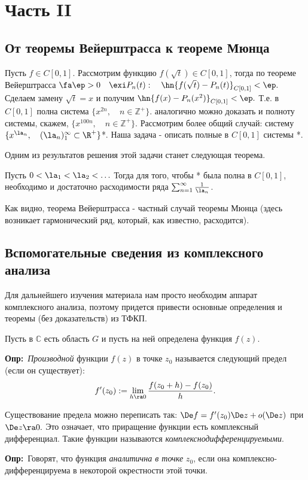 \documentclass[a4paper]{article}
\def\defin{\noindent\textbf{Опр:}\ }
\begin{document}
\newpage
\section{Часть II}
\subsection{От теоремы Вейерштрасса к теореме Мюнца}
Пусть $f\in C[0,1]$. Рассмотрим функцию $f(\sqrt{t})\in C[0,1]$, тогда по теореме Вейерштрасса
$\fa\ep>0\quad\exi P_n(t):\quad\hn{f(\sqrt{t})-P_n(t)}_{C[0,1]}<\ep.$ Сделаем замену
$\sqrt{t}=x$ и получим $\hn{f(x)-P_n(x^2)}_{C[0,1]}<\ep.$ Т.е. в $C[0,1]$ полна система
$\{x^{2n},\quad n\in\mathbb{Z}^{+}\}$. аналогично можно доказать и полноту системы, скажем, $\{x^{100n},\quad
n\in\mathbb{Z}^{+}\}$. Рассмотрим более общий случай: систему
$\{x^{\la_n},\quad(\la_n)_1^{\infty}\subset\R ^{+}\}$*. Наша задача - описать полные в
$C[0,1]$ системы *.

Одним из результатов решения этой задачи станет следующая теорема.
\begin{theorems}[Мюнц 1914г.]
Пусть $0<\la_1<\la_2<\ldots$ Тогда для того, чтобы * была
полна в $C[0,1]$, необходимо и достаточно расходимости ряда
$\sum_{n=1}^{\infty}\frac1{\la_n}$.
\end{theorems}
Как видно, теорема Вейерштрасса - частный случай теоремы Мюнца
(здесь возникает гармонический ряд, который, как известно,
расходится).

\subsection{Вспомогательные сведения из комплексного анализа}
Для дальнейшего изучения материала нам просто необходим аппарат комплексного анализа, поэтому придется
привести основные определения и теоремы (без доказательств) из ТФКП.

Пусть в $\mathbb{C}$ есть область $G$ и пусть на ней определена
функция $f(z)$.

\defin \emph{Производной} функции $f(z)$ в точке
$z_0$ называется следующий предел (если он существует):
$$f'(z_0):=\lim_{h\ra0}\frac{f(z_0+h)-f(z_0)}{h}.$$

Существование предела можно переписать так: $\De
f=f'(z_0)\De z+o(\De z)$ при $\De z\ra0.$ Это
означает, что приращение функции есть комплексный дифференциал.
Такие функции называются \emph{комплексно\д дифференцируемыми}.

\defin Говорят, что функция \emph{аналитична в
точке} $z_0$, если она комплексно-дифференцируема в некоторой
окрестности этой точки.
\end{document}
